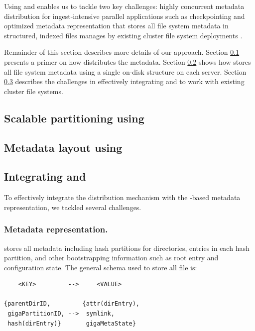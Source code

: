Using \giga{} and \ldb{} enables us to tackle two key challenges: highly 
concurrent metadata distribution for ingest-intensive parallel applications
such as checkpointing \cite{PLFS} and 
optimized metadata representation that stores all file system
metadata in structured, indexed files manages by existing cluster file system
deployments \cite{LevelDB}. 

Remainder of this section describes more details of our approach. 
Section \ref{design.giga} presents a primer on how \giga{} distributes the
metadata. 
Section \ref{design.tablefs} shows how \ldb{} stores all file system metadata
using a single on-disk structure on each server. 
Section \ref{design.integration} describes the challenges in effectively
integrating \giga{} and \ldb{} to work with existing cluster file systems.

\subsection{Scalable partitioning using \giga{}}
\label{design.giga}


\subsection{Metadata layout using \ldb{}}
\label{design.tablefs}


\subsection{Integrating \giga{} and \ldb{}}
\label{design.integration}

To effectively integrate the \giga{} distribution mechanism with the
\ldb{}-based metadata representation, we tackled several challenges. 

\subsubsection*{Metadata representation.}

\ldb{} stores all metadata including \giga{} hash
partitions for directories, entries in each hash partition, and other
bootstrapping information such as root entry and \giga{} configuration state.
The general schema used to store all file is:

\begin{verbatim}
    <KEY>         -->     <VALUE> 

{parentDirID,         {attr(dirEntry),
 gigaPartitionID, -->  symlink,
 hash(dirEntry)}       gigaMetaState}
\end{verbatim}

